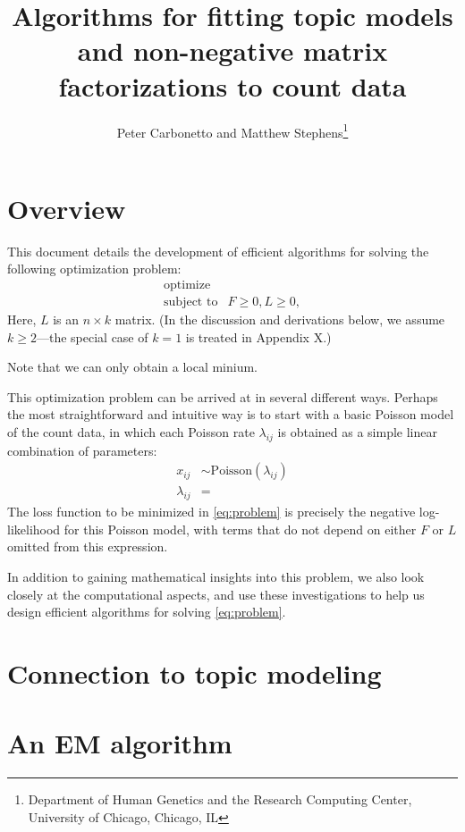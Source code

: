 \documentclass[final]{siamart171218}
\title{Algorithms for fitting topic models and non-negative matrix 
  factorizations to count data}
\author{Peter Carbonetto and Matthew Stephens\thanks{Department of 
  Human Genetics and the Research Computing Center, University of 
  Chicago, Chicago, IL}}
\begin{document}
\maketitle

\section{Overview}

This document details the development of efficient algorithms for
solving the following optimization problem:
\begin{equation}
\begin{array}{ll}
\mbox{optimize}   & \\
\mbox{subject to} & F \geq 0, L \geq 0,
\end{array}
\label{eq:problem}
\end{equation}
Here, $L$ is an $n \times k$ matrix. (In the discussion and
derivations below, we assume $k \geq 2$---the special case of $k = 1$
is treated in Appendix X.) 

Note that we can only obtain a local minium.

This optimization problem can be arrived at in several different
ways. Perhaps the most straightforward and intuitive way is to start
with a basic Poisson model of the count data, in which each Poisson
rate $\lambda_{ij}$ is obtained as a simple linear combination of
parameters:
\begin{align*}
x_{ij}       &\sim \mathrm{Poisson}(\lambda_{ij}) \\
\lambda_{ij} &=
\end{align*}
The loss function to be minimized in \eqref{eq:problem} is precisely
the negative log-likelihood for this Poisson model, with terms that do
not depend on either $F$ or $L$ omitted from this expression.

In addition to gaining mathematical insights into this problem, we
also look closely at the computational aspects, and use these
investigations to help us design efficient algorithms for
solving \eqref{eq:problem}.

\section{Connection to topic modeling}

\section{An EM algorithm}
\end{document}
